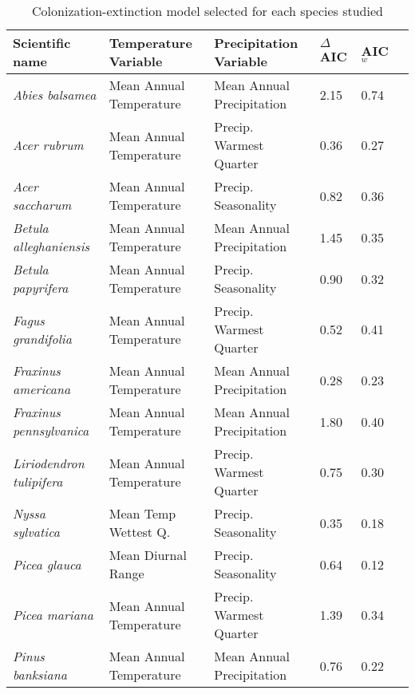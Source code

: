 \begin{table}[tb]
\begin{threeparttable}
\label{tab:model_selection}
\caption{Colonization-extinction model selected for each species studied}
\begin{tabular}{llllll}
\toprule
Scientific name               & Temperature Variable    & Precipitation Variable    & $\Delta$AIC\tnote{1} & AIC$_w$\tnote{2} \\ 
\midrule
{\it Abies balsamea}          & Mean Annual Temperature & Mean Annual Precipitation & 2.15                 & 0.74             \\
{\it Acer rubrum}             & Mean Annual Temperature & Precip. Warmest Quarter   & 0.36                 & 0.27             \\
{\it Acer saccharum}          & Mean Annual Temperature & Precip. Seasonality       & 0.82                 & 0.36             \\
{\it Betula alleghaniensis}   & Mean Annual Temperature & Mean Annual Precipitation & 1.45                 & 0.35             \\
{\it Betula papyrifera}       & Mean Annual Temperature & Precip. Seasonality       & 0.90                 & 0.32             \\
{\it Fagus grandifolia}       & Mean Annual Temperature & Precip. Warmest Quarter   & 0.52                 & 0.41             \\
{\it Fraxinus americana}      & Mean Annual Temperature & Mean Annual Precipitation & 0.28                 & 0.23             \\
{\it Fraxinus pennsylvanica}  & Mean Annual Temperature & Mean Annual Precipitation & 1.80                 & 0.40             \\
{\it Liriodendron tulipifera} & Mean Annual Temperature &  Precip. Warmest Quarter  & 0.75                 & 0.30             \\
{\it Nyssa sylvatica}         & Mean Temp Wettest Q.    & Precip. Seasonality       & 0.35                 & 0.18             \\
{\it Picea glauca}            & Mean Diurnal Range      & Precip. Seasonality       & 0.64                 & 0.12             \\
{\it Picea mariana}           & Mean Annual Temperature & Precip. Warmest Quarter   & 1.39                 & 0.34             \\
{\it Pinus banksiana}         & Mean Annual Temperature & Mean Annual Precipitation & 0.76                 & 0.22             \\

\end{tabular}
\end{threeparttable}
\end{table}
